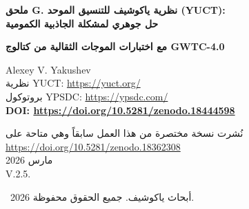 \documentclass[11pt,a4paper]{article}
\theoremstyle{remark}
\newcommand{\Keff}{K_{\mathrm{eff}}}
\begin{document}
	
	\begin{titlepage}
		\begin{center}
			\vspace*{0cm}
			
			\Huge\textbf{ملحق G. نظرية ياكوشيف للتنسيق الموحد (YUCT): \\ حل جوهري لمشكلة الجاذبية الكمومية}
			
			\vspace{0.3cm}
			\Large\textbf{مع اختبارات الموجات الثقالية من كتالوج GWTC-4.0}
			
			\vspace{0.8cm}
			\Large
			Alexey V. Yakushev\\
			
			نظرية YUCT: \url{https://yuct.org/}\\
			بروتوكول YPSDC: \url{https://ypsdc.com/}\\
			
			\vspace{1.5cm}
			\textbf{DOI: \url{https://doi.org/10.5281/zenodo.18444598}}\\
			
			\vspace{0.5cm}
			
			\large
			نُشرت نسخة مختصرة من هذا العمل سابقاً وهي متاحة على\\ \url{https://doi.org/10.5281/zenodo.18362308}\\
			
			\vspace{0.5cm}
			مارس 2026 \\ \large V.2.5.
			
			\vspace{3cm}
			\textcopyright~2026 أبحاث ياكوشيف. جميع الحقوق محفوظة.
			
			\newpage
			
			\begin{abstract}
				\noindent
				تقدم هذه الورقة صياغة رياضية كاملة لنظرية ياكوشيف للتنسيق الموحد (YUCT) كحل نهائي لمشكلة الجاذبية الكمومية. على عكس النهج التقليدية التي تحاول تكميم الزمكان أو الجرافيتونات، تفترض YUCT أن كلاً من ميكانيكا الكم والنسبية العامة ينبثقان من مبدأ أكثر جوهرية هو \emph{التنسيق}. نطور: (1) إطاراً هندسياً ذا 19 بعداً مع حقول تنسيق $\Psi_{MN}$، (2) ثالوث D+I•R كأساس أنطولوجي، (3) لاغرانجيان كلي $\mathcal{L}_{\text{YUCT}}$ يوحد جميع التفاعلات الفيزيائية من خلال كفاءة التنسيق $\Keff$، (4) اشتقاق كل من الديناميكا الكمومية والهندسة الثقالية كحالات حدية، (5) تنبؤات محددة لظواهر الجاذبية الكمومية قابلة للاختبار على المستويين المختبري والفيزيائي الفلكي. تزيل النظرية التناقضات المفاهيمية بين اللاموضعية الكمومية والسببية النسبية، وتقدم تفسيراً طبيعياً للطاقة المظلمة والمادة المظلمة، وتوفر إطاراً رياضياً متسقاً حيث تنحل "مشكلة الجاذبية الكمومية" في النظرية العامة للأنظمة المنسقة.
				

\end{abstract}
\end{center}
\end{titlepage}
\end{document}
